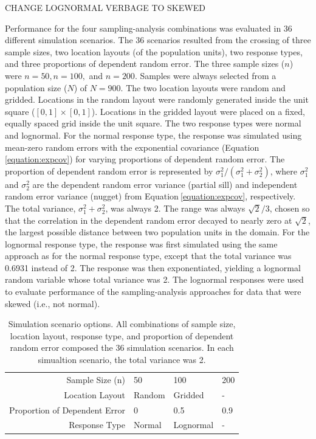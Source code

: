 \documentclass[]{elsarticle} %
\begin{document}
CHANGE LOGNORMAL VERBAGE TO SKEWED

Performance for the four sampling-analysis combinations was evaluated in
36 different simulation scenarios. The 36 scenarios resulted from the
crossing of three sample sizes, two location layouts (of the population
units), two response types, and three proportions of dependent random
error. The three sample sizes (\(n\)) were \(n = 50, n = 100,\) and
\(n = 200\). Samples were always selected from a population size (\(N\))
of \(N = 900\). The two location layouts were random and gridded.
Locations in the random layout were randomly generated inside the unit
square (\([0, 1] \times [0, 1]\)). Locations in the gridded layout were
placed on a fixed, equally spaced grid inside the unit square. The two
response types were normal and lognormal. For the normal response type,
the response was simulated using mean-zero random errors with the
exponential covariance (Equation\(~\)\ref{equation:expcov}) for varying
proportions of dependent random error. The proportion of dependent
random error is represented by
\(\sigma^2_1 / (\sigma^2_1 + \sigma^2_2)\), where \(\sigma^2_1\) and
\(\sigma^2_2\) are the dependent random error variance (partial sill)
and independent random error variance (nugget) from
Equation\(~\)\ref{equation:expcov}, respectively. The total variance,
\(\sigma^2_1 + \sigma^2_2\), was always 2. The range was always
\(\sqrt{2} / 3\), chosen so that the correlation in the dependent random
error decayed to nearly zero at \(\sqrt{2}\), the largest possible
distance between two population units in the domain. For the lognormal
response type, the response was first simulated using the same approach
as for the normal response type, except that the total variance was
0.6931 instead of 2. The response was then exponentiated, yielding a
lognormal random variable whose total variance was 2. The lognormal
responses were used to evaluate performance of the sampling-analysis
approaches for data that were skewed (i.e., not normal).

\begin{table}[ht]
\centering
\begin{tabular}{r|lll}
   \hline
Sample Size (n) & 50 & 100 & 200 \\ 
  Location Layout & Random & Gridded & - \\ 
  Proportion of Dependent Error & 0 & 0.5 & 0.9 \\ 
  Response Type & Normal & Lognormal & - \\ 
   \hline
\end{tabular}
\caption{\label{tab:parmtab} Simulation scenario options. All combinations of sample size, location layout, response type, and proportion of dependent random error composed the 36 simulation scenarios. In each simualtion scenario, the total variance was 2.} 
\end{table}
\end{document}
